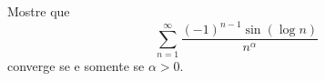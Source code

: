Mostre que \[\sum^{\infty}_{n=1}\frac{(-1)^{n-1}\sin(\log n)}{n^\alpha}\] converge se e somente se \(\alpha>0\).
